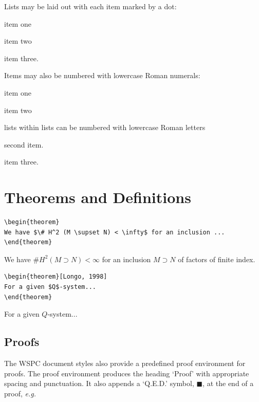 \documentclass{ws-jai}
\begin{document}
Lists may be laid out with each item marked by a dot:
\begin{itemlist}
\item item one
\item item two
\item item three.
\end{itemlist}

Items may also be numbered with lowercase Roman numerals:
\begin{romanlist}[(iii)]
\item item one
\item item two
    \begin{alphlist}[(b)]
    \item lists within lists can be numbered with lowercase Roman letters
    \item second item.
    \end{alphlist}
\item item three.
\end{romanlist}

\section{Theorems and Definitions}

\begin{verbatim}
\begin{theorem}
We have $\# H^2 (M \supset N) < \infty$ for an inclusion ...
\end{theorem}
\end{verbatim}


\begin{theorem}
We have $\# H^2 (M \supset N) < \infty$ for an inclusion $M \supset
N$ of factors of finite index.
\end{theorem}


\begin{verbatim}
\begin{theorem}[Longo, 1998]
For a given $Q$-system...
\end{theorem}
\end{verbatim}


\begin{theorem}[Longo, 1998]
For a given $Q$-system...
\end{theorem}

\subsection{Proofs}
The WSPC document styles also provide a predefined proof environment
for proofs. The proof \hbox{environment} produces the heading
`Proof' with appropriate spacing and punctuation. It also appends a
`Q.E.D.' symbol, $\blacksquare$, at the end of a proof, {\it e.g.}
\end{document}
